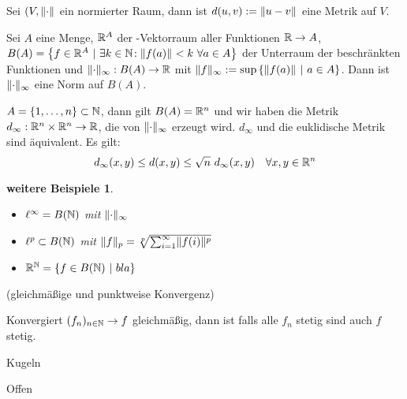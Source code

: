 \documentclass{skript}
\begin{document}
\begin{stz}
    Sei $(V, \norm{\cdot}$ ein normierter Raum, dann ist $d(u,v) := \norm{u - v}$
    eine Metrik auf $V$.
\end{stz}

\begin{dfn}
    Sei $A$ eine Menge, $\mathbb{R}^A$ der \R-Vektorraum aller Funktionen $\mathbb{R} \to A$,
    $B(A) = \mdef[f\in\R^A]{\exists k\in\N\!: \norm{f(a)} < k \ \forall a \in A}$
    der Unterraum der beschränkten Funktionen und $\supnorm{\cdot}: B(A) \to \R$
    mit $\supnorm{f} := \sup \mdef[\norm{f(a)}]{a\in A}$. Dann ist
    $\supnorm{\cdot}$ eine Norm auf $B(A)$.
\end{dfn}

\begin{bsp}
    $A = \mdef{1,\ldots,n}\subset \N$, dann gilt $B(A) = \mathbb{R}^n$ und wir haben
    die Metrik $d_\infty: \mathbb{R}^n \times \mathbb{R}^n \to \mathbb{R}$, die von $\supnorm{\cdot}$
    erzeugt wird. $d_\infty$ und die euklidische Metrik sind äquivalent.
    Es gilt:
    \[d_\infty(x,y) \le d(x,y) \le \sqrt{n}\ d_\infty(x,y) \quad \forall x,y\in\R^n\]
\end{bsp}

\newtheorem{wbsp}[dfn]{weitere Beispiele}
\begin{wbsp}
    \begin{itemize}
        \item $\ell^\infty = B(\mathbb{N})$ mit $\supnorm{\cdot}$
        \item $\ell^p \subset B(\mathbb{N})$ mit
                $\norm[p]{f} = \sqrt[p]{\sum^\infty_{i=1} \norm{f(i)}^p}$
        \item $\R^\N = \mdef[f \in B(\N)]{bla}$
    \end{itemize}
\end{wbsp}

\begin{dfn}
    (gleichmäßige und punktweise Konvergenz)
\end{dfn}

\begin{stz}
    Konvergiert $(f_n)_{n\in\mathbb{N}} \to f$ gleichmäßig, dann ist falls alle $f_n$
    stetig sind auch $f$ stetig.
\end{stz}

\begin{dfn}
    Kugeln
\end{dfn}

\begin{dfn}
    Offen
\end{dfn}
\end{document}
